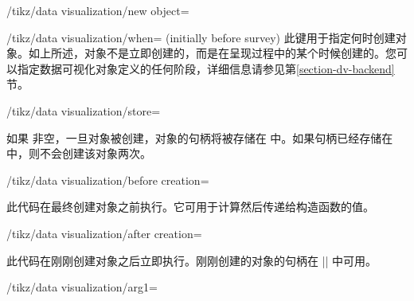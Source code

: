 \begin{key}{/tikz/data visualization/new object=}
\begin{key}{/tikz/data visualization/when= (initially before survey)}
        此键用于指定何时创建对象。如上所述，对象不是立即创建的，而是在呈现过程中的某个时候创建的。您可以指定数据可视化对象定义的任何阶段，详细信息请参见第\ref{section-dv-backend}节。
    \end{key}
    \begin{key}{/tikz/data visualization/store=} %

        如果  非空，一旦对象被创建，对象的句柄将被存储在  中。如果句柄已经存储在  中，则不会创建该对象两次。
    \end{key}
    \begin{key}{/tikz/data visualization/before creation=} %

        此代码在最终创建对象之前执行。它可用于计算然后传递给构造函数的值。
    \end{key}
    \begin{key}{/tikz/data visualization/after creation=} %

        此代码在刚刚创建对象之后立即执行。刚刚创建的对象的句柄在 |\tikzdvobj| 中可用。
    \end{key}
    \begin{key}{/tikz/data visualization/arg1=} %


\end{key}
\end{key}
